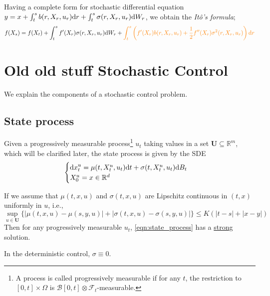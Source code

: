 \documentclass[11pt]{book}
\newcommand{\dd}{\text{\normalfont d}}
\newcommand{\dt}{\text{\normalfont d}t}
\newcommand{\dr}{\text{\normalfont d}r}
\newcommand{\dx}{\text{\normalfont d}x}
\newcommand{\dW}{\text{\normalfont d}W}
\begin{document}
Having a complete form for stochastic differential equation $y=x+\int_t^s b(r,X_r,u_r)\dr+\int_t^s \sigma(r,X_r,u_r)\dW_r$, we obtain the \emph{Itô's formula};
\[
f(X_s)=f(X_t)+\int_t^s f^\prime(X_r)\sigma(r,X_r,u_r)\dW_r + {\color{orange}\int_t^s \left(f^\prime(X_r)b(r,X_r,u_r)+\frac12f^{\prime\prime}(X_r)\sigma^2(r,X_r,u_r)\right)\dr}
\]
\section{}
\chapter{Old old stuff Stochastic Control}
We explain the components of a stochastic control problem.
\section{State process}
Given a progressively measurable process\footnote{A process is called progressively measurable if for any $t$, the restriction to $[0,t]\times\Omega$ is $\mathcal{B}[0,t]\otimes\mathcal{F}_t$-measurable.} $u_t$ taking values in a set $\mathbf{U}\subseteq \mathbb{R}^m$, which will be clarified later, the state process is given by the SDE
\begin{equation}\label{eqn:state_process}
	\begin{cases}
	    {\dx}^u_t =\mu(t,X_t^u,u_t){{\dt}}+\sigma(t,X_t^u,u_t){\dd}B_t\\
     X^u_0=x\in\mathbb{R}^d
	\end{cases}
\end{equation}
\begin{rem}
    If we assume that $\mu(t,x,u)$ and $\sigma(t,x,u)$ are Lipschitz continuous in $(t,x)$ uniformly in $u$, i.e.,
    \begin{equation}
       \sup_{u\in\mathbf{U}}\{ |\mu(t,x,u)-\mu(s,y,u)|+|\sigma(t,x,u)-\sigma(s,y,u)|\}\le K(|t-s|+|x-y|)
    \end{equation}
    Then for any progressively measurable $u_t$, \eqref{eqn:state_process} has a \underline{strong} solution.
\end{rem}
\begin{rem}
    In the deterministic control, $\sigma\equiv0$.
\end{rem}
\end{document}
